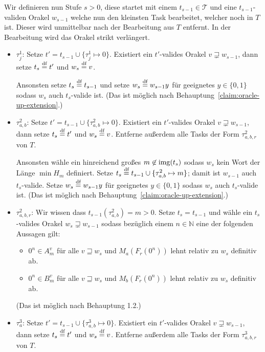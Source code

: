 
Wir definieren nun Stufe $s>0$, diese startet mit einem $t_{s-1}\in\mathcal T$ und eine $t_{s-1}$-validen Orakel $w_{s-1}$ welche nun den kleinsten Task bearbeitet, welcher noch in $T$ ist. Dieser wird unmittelbar nach der Bearbeitung aus $T$ entfernt. In der Bearbeitung wird das Orakel strikt verlängert.
\begin{itemize}

    \item $\tau^1_j$: Setze $t'=t_{s-1}\cup\{\tau^1_j\mapsto 0\}$. Existiert ein $t'$-valides Orakel $v\sqsupsetneq w_{s-1}$, dann setze $t_s\stackrel{\text{df}}{=} t'$ und $w_s\stackrel{\text{df}}{=} v$.

        Ansonsten setze $t_s\stackrel{\text{df}}{=} t_{s-1}$ und setze $w_s\stackrel{\text{df}}{=} w_{s-1}y$ für geeignetes $y\in\{0,1\}$ sodass $w_s$ auch $t_s$-valide ist. (Das ist möglich nach Behauptung~\ref{claim:oracle-up-extension}.)

    \item $\tau^2_{a,b}$: Setze $t'=t_{s-1}\cup\{\tau^2_{a,b}\mapsto 0\}$. Existiert ein $t'$-valides Orakel $v\sqsupsetneq w_{s-1}$, dann setze $t_s\stackrel{\text{df}}{=} t'$ und $w_s\stackrel{\text{df}}{=} v$. Entferne außerdem alle Tasks der Form $\tau^2_{a,b,r}$ von $T$.

        Ansonsten wähle ein hinreichend großes $m\not\in \operatorname{img}(t_s)$ sodass $w_s$ kein Wort der Länge $\min H_m$ definiert. Setze $t_s\stackrel{\text{df}}{=} t_{s-1}\cup \{ \tau^2_{a,b}\mapsto m \}$; damit ist $w_{s-1}$ auch $t_s$-valide. Setze $w_s\stackrel{\text{df}}{=} w_{s-1}y$ für geeignetes $y\in\{0,1\}$ sodass $w_s$ auch $t_s$-valide ist. (Das ist möglich nach Behauptung~\ref{claim:oracle-up-extension}.)

    \item $\tau^2_{a,b,r}$: Wir wissen dass $t_{s-1}(\tau^2_{a,b})=m>0$. Setze $t_s=t_{s-1}$ und wähle ein $t_s$-valides Orakel $w_s\sqsupsetneq w_{s-1}$ sodass bezüglich einem $n\in\mathbb N$ eine der folgenden Aussagen gilt:
        \begin{itemize}[nosep,endpenalty=10000]
            \item $0^n\in A_m^v$ für alle $v\sqsupseteq w_s$ und $M_a(F_r(0^n))$ lehnt relativ zu $w_s$ definitiv ab.
            \item $0^n\in B_m^v$ für alle $v\sqsupseteq w_s$ und $M_b(F_r(0^n))$ lehnt relativ zu $w_s$ definitiv ab.
        \end{itemize} (Das ist möglich nach Behauptung 1.2.)

    \item $\tau^3_{a}$: Setze $t'=t_{s-1}\cup\{\tau^3_{a,b}\mapsto 0\}$. Existiert ein $t'$-valides Orakel $v\sqsupsetneq w_{s-1}$, dann setze $t_s\stackrel{\text{df}}{=} t'$ und $w_s\stackrel{\text{df}}{=} v$. Entferne außerdem alle Tasks der Form $\tau^3_{a,b,r}$ von $T$.


\end{itemize}
